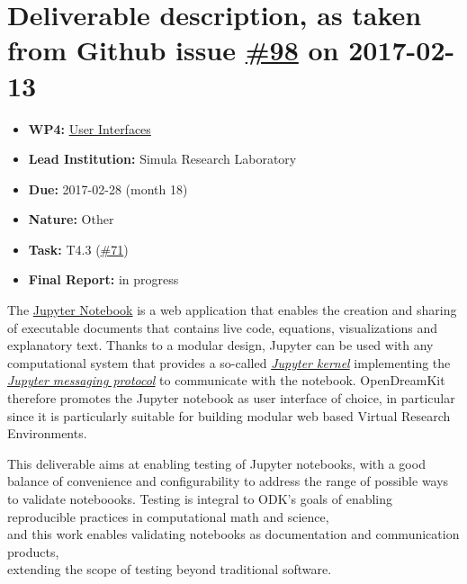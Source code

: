 \section*{\texorpdfstring{Deliverable description, as taken from Github
issue
\href{https://github.com/OpenDreamKit/OpenDreamKit/issues/98}{\#98} on
2017-02-13}{Deliverable description, as taken from Github issue \#98 on 2017-02-13}}\label{deliverable-description-as-taken-from-github-issue-98-on-2017-02-13}

\begin{itemize}
\tightlist
\item
  \textbf{WP4:}
  \href{https://github.com/OpenDreamKit/OpenDreamKit/tree/master/WP4}{User
  Interfaces}
\item
  \textbf{Lead Institution:} Simula Research Laboratory
\item
  \textbf{Due:} 2017-02-28 (month 18)
\item
  \textbf{Nature:} Other
\item
  \textbf{Task:} T4.3
  (\href{https://github.com/OpenDreamKit/OpenDreamKit/issues/71}{\#71})
\item
  \textbf{Final Report:} in progress
\end{itemize}

The \href{https://jupyter.org}{Jupyter Notebook} is a web application
that enables the creation and sharing of executable documents that
contains live code, equations, visualizations and explanatory text.
Thanks to a modular design, Jupyter can be used with any computational
system that provides a so-called
\href{https://jupyter.readthedocs.io/en/latest/projects/kernels.html}{\emph{Jupyter
kernel}} implementing the
\href{https://jupyter-client.readthedocs.io/en/latest/}{\emph{Jupyter
messaging protocol}} to communicate with the notebook. OpenDreamKit
therefore promotes the Jupyter notebook as user interface of choice, in
particular since it is particularly suitable for building modular web
based Virtual Research Environments.

This deliverable aims at enabling testing of Jupyter notebooks, with a
good balance of convenience and configurability to address the range of
possible ways to validate noteboooks. Testing is integral to ODK's goals
of enabling reproducible practices in computational math and science,\\
and this work enables validating notebooks as documentation and
communication products,\\
extending the scope of testing beyond traditional software.

